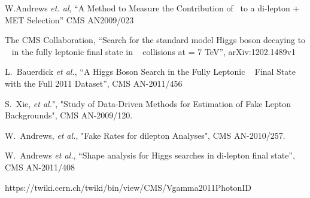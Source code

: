 \begin{thebibliography}{99}

W.Andrews {\it et. al}, ``A Method to Measure the Contribution of \dyll\ to a di-lepton + MET Selection''
CMS AN2009/023

  The CMS Collaboration, ``Search for the standard model Higgs boson decaying to \wwpm~ in the fully leptonic ﬁnal state in \PP~ collisions at \sqrts= 7 TeV'',
  arXiv:1202.1489v1 
     
  L.~Bauerdick {\it et al.}, ``A Higgs Boson Search in the Fully Leptonic \wwpm~ Final State with the Full 2011 Dataset'',
  CMS AN-2011/456 

S.~Xie, \textit{et al.}", "Study of Data-Driven Methods for Estimation of Fake Lepton Backgrounds", 
CMS AN-2009/120.

W.~Andrews, \textit{et al.}, "Fake Rates for dilepton Analyses", CMS AN-2010/257.

  W.~Andrews {\it et al.}, ``Shape analysis for Higgs searches in di-lepton final state'',
  CMS AN-2011/408

  https://twiki.cern.ch/twiki/bin/view/CMS/Vgamma2011PhotonID

\end{thebibliography}


